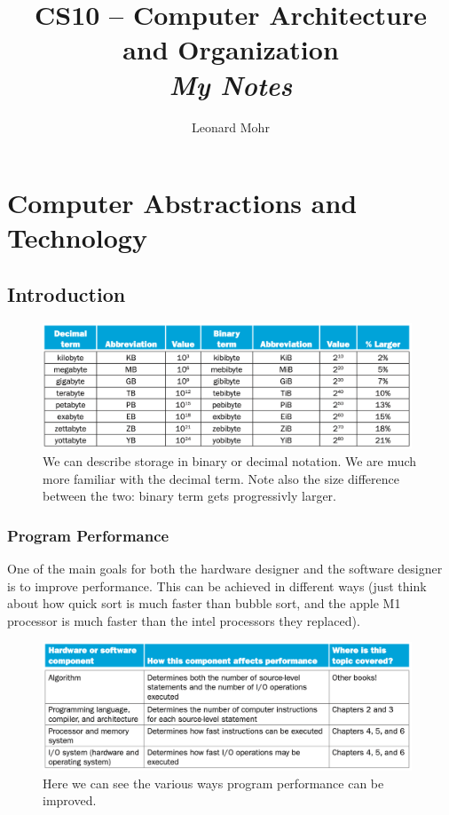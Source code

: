\documentclass[10pt]{article}
\begin{document}
	\title{{CS10 -- Computer Architecture and Organization}\\{\normalsize{\itshape My Notes}}}
	\author{Leonard Mohr}
	\maketitle
	\newpage
	\pagestyle{fancy}

\section{Computer Abstractions and Technology}
\subsection{Introduction}\label{subsec:}
\begin{figure}[H]
  \centering
  \includegraphics[width=11cm]{1.png}
  \caption{We can describe storage in binary or decimal notation. We are much more familiar with the decimal term.  Note also the size difference between the two: binary term gets progressivly larger.}
  \label{fig:}
\end{figure}

\subsubsection{Program Performance}
One of the main goals for both the hardware designer and the software designer is to improve performance.  This can be achieved in different ways (just think about how quick sort is much faster than bubble sort, and the apple M1 processor is much faster than the intel processors they replaced).
\begin{figure}[H]
  \centering
  \includegraphics[width=11cm]{2.png}
  \caption{Here we can see the various ways program performance can be improved.}
  \label{fig:}
\end{figure}
\end{document}
